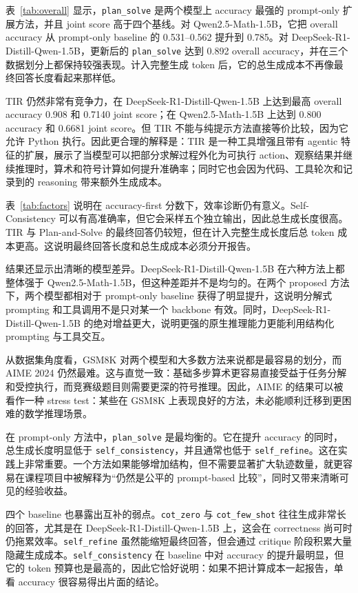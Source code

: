\documentclass[conference]{IEEEtran}
\newcommand{\qwen}{Qwen2.5-Math-1.5B}
\newcommand{\deepseek}{DeepSeek-R1-Distill-Qwen-1.5B}
\begin{document}
表~\ref{tab:overall} 显示，\texttt{plan\_solve} 是两个模型上 accuracy 最强的 prompt-only 扩展方法，并且 joint score 高于四个基线。对 \qwen{}，它把 overall accuracy 从 prompt-only baseline 的 0.531--0.562 提升到 0.785。对 \deepseek{}，更新后的 \texttt{plan\_solve} 达到 0.892 overall accuracy，并在三个数据划分上都保持较强表现。计入完整生成 token 后，它的总生成成本不再像最终回答长度看起来那样低。

TIR 仍然非常有竞争力，在 \deepseek{} 上达到最高 overall accuracy 0.908 和 0.7140 joint score；在 \qwen{} 上达到 0.800 accuracy 和 0.6681 joint score。但 TIR 不能与纯提示方法直接等价比较，因为它允许 Python 执行。因此更合理的解释是：TIR 是一种工具增强且带有 agentic 特征的扩展，展示了当模型可以把部分求解过程外化为可执行 action、观察结果并继续推理时，算术和符号计算如何提升准确率；同时它也会因为代码、工具轮次和记录到的 reasoning 带来额外生成成本。

表~\ref{tab:factors} 说明在 accuracy-first 分数下，效率诊断仍有意义。Self-Consistency 可以有高准确率，但它会采样五个独立输出，因此总生成长度很高。TIR 与 Plan-and-Solve 的最终回答仍较短，但在计入完整生成长度后总 token 成本更高。这说明最终回答长度和总生成成本必须分开报告。

结果还显示出清晰的模型差异。\deepseek{} 在六种方法上都整体强于 \qwen{}，但这种差距并不是均匀的。在两个 proposed 方法下，两个模型都相对于 prompt-only baseline 获得了明显提升，这说明分解式 prompting 和工具调用不是只对某一个 backbone 有效。同时，\deepseek{} 的绝对增益更大，说明更强的原生推理能力更能利用结构化 prompting 与工具交互。

从数据集角度看，GSM8K 对两个模型和大多数方法来说都是最容易的划分，而 AIME 2024 仍然最难。这与直觉一致：基础多步算术更容易直接受益于任务分解和受控执行，而竞赛级题目则需要更深的符号推理。因此，AIME 的结果可以被看作一种 stress test：某些在 GSM8K 上表现良好的方法，未必能顺利迁移到更困难的数学推理场景。

在 prompt-only 方法中，\texttt{plan\_solve} 是最均衡的。它在提升 accuracy 的同时，总生成长度明显低于 \texttt{self\_consistency}，并且通常也低于 \texttt{self\_refine}。这在实践上非常重要。一个方法如果能够增加结构，但不需要显著扩大轨迹数量，就更容易在课程项目中被解释为“仍然是公平的 prompt-based 比较”，同时又带来清晰可见的经验收益。

四个 baseline 也暴露出互补的弱点。\texttt{cot\_zero} 与 \texttt{cot\_few\_shot} 往往生成非常长的回答，尤其是在 \deepseek{} 上，这会在 correctness 尚可时仍拖累效率。\texttt{self\_refine} 虽然能缩短最终回答，但会通过 critique 阶段积累大量隐藏生成成本。\texttt{self\_consistency} 在 baseline 中对 accuracy 的提升最明显，但它的 token 预算也是最高的，因此它恰好说明：如果不把计算成本一起报告，单看 accuracy 很容易得出片面的结论。
\end{document}
